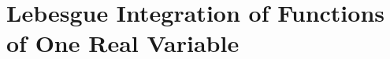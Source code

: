 \documentclass{mathbook}
\date{\today}
\begin{document}
\makecover
\frontmatter
\tableofcontents

\mainmatter

\part{Lebesgue Integration of Functions of One Real Variable}
\end{document}
